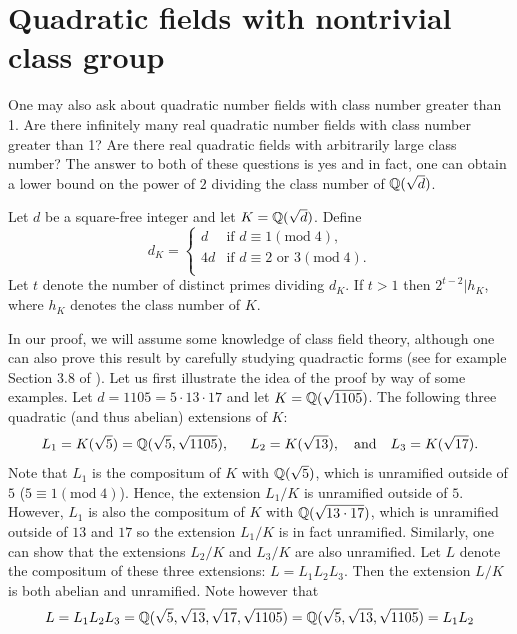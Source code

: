 \documentclass{book}
\begin{document}
\section{Quadratic fields with nontrivial class group}
One may also ask about quadratic number fields with class number greater than
1.  Are there infinitely many real quadratic number fields with class number
greater than 1?  Are there real quadratic fields with arbitrarily large class
number?  The answer to both of these questions is yes and in fact, one can
obtain a lower bound on the power of $2$ dividing the class number
of $\mathbb{Q}(\sqrt{d})$.
\begin{proposition}
Let $d$ be a square-free integer and let $K = \mathbb{Q}(\sqrt{d})$.
Define
$$
d_K = \left\{\begin{array}{rl}
d & \text{if  } d \equiv 1 (\mathrm{mod} \; 4), \\
4d & \text{if  } d \equiv 2 \text{ or } 3 (\mathrm{mod} \; 4). \\
\end{array}\right.
$$
Let $t$ denote the number of distinct primes dividing $d_K$.
If $t > 1$ then $2^{t-2}|h_K$, where $h_K$ denotes the class number of $K$.
\end{proposition}
In our proof, we will assume some knowledge of class field theory, although
one can also prove this result by carefully studying quadractic forms (see for
example Section 3.8 of \cite{borevich-shafarevich}).
Let us first illustrate the idea of the proof by way of some examples.
Let $d = 1105 = 5\cdot 13 \cdot 17$ and let $K = \mathbb{Q}(\sqrt{1105})$.  The
following three quadratic (and thus abelian) extensions of $K$:
$$
L_1 = K(\sqrt{5}) = \mathbb{Q}(\sqrt{5}, \sqrt{1105}), \hspace{15pt}
L_2 = K(\sqrt{13}),\hspace{10pt} \text{and} \hspace{10pt} L_3 = K(\sqrt{17}).
$$
Note that $L_1$ is the compositum of $K$ with $\mathbb{Q}(\sqrt{5})$, which is
unramified outside of $5$ ($5 \equiv 1 (\mathrm{mod} \; 4)$).  Hence, the
extension $L_1/K$ is unramified outside of $5$.  However, $L_1$ is also the
compositum of $K$ with $\mathbb{Q}(\sqrt{13\cdot 17})$, which is unramified outside of
$13$ and $17$ so the extension $L_1/K$ is in fact unramified.  Similarly, one
can show that the extensions $L_2/K$ and $L_3/K$ are also unramified.  Let
$L$ denote the compositum of these three extensions: $L = L_1 L_2 L_3$.  Then
the extension $L/K$ is both abelian and unramified.  Note however that
$$
L = L_1L_2L_3 = \mathbb{Q}(\sqrt{5}, \sqrt{13}, \sqrt{17}, \sqrt{1105}) =
\mathbb{Q}(\sqrt{5},\sqrt{13},\sqrt{1105}) = L_1L_2
$$
\end{document}
